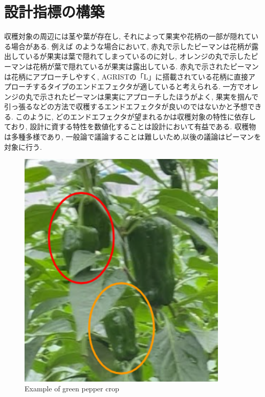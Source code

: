 \chapter{設計指標の構築}
\label{chap:designindex}

収穫対象の周辺には茎や葉が存在し, それによって果実や花柄の一部が隠れている場合がある. 
例えば のような場合において, 赤丸で示したピーマンは花柄が露出しているが果実は葉で隠れてしまっているのに対し, オレンジの丸で示したピーマンは花柄が葉で隠れているが果実は露出している.
赤丸で示されたピーマンは花柄にアプローチしやすく, AGRISTの「L」に搭載されている花柄に直接アプローチするタイプのエンドエフェクタが適していると考えられる.
一方でオレンジの丸で示されたピーマンは果実にアプローチしたほうがよく, 果実を掴んで引っ張るなどの方法で収穫するエンドエフェクタが良いのではないかと予想できる.
このように, どのエンドエフェクタが望まれるかは収穫対象の特性に依存しており, 設計に資する特性を数値化することは設計において有益である.
収穫物は多種多様であり, 一般論で議論することは難しいため,以後の議論はピーマンを対象に行う.

\vspace{5mm}
\begin{figure}[H]
     \centering
     \includegraphics[width=100mm]{images/png/plantex.png}
     \caption{Example of green pepper crop}
     \label{Fig:plantex}
\end{figure}

%

%

%

%

%